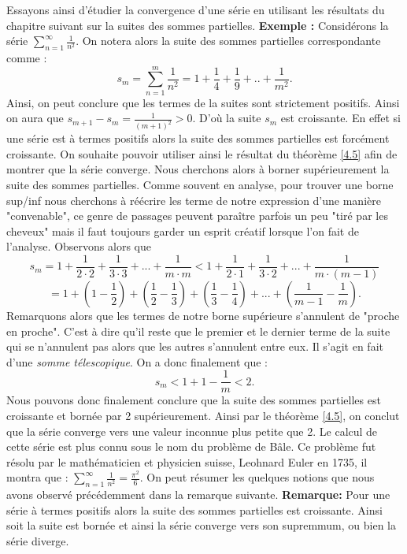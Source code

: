 \documentclass[a4paper, 12pt, french, twoside]{article}
\begin{document}
Essayons ainsi d'étudier la convergence d'une série en utilisant les résultats du chapitre suivant sur la suites des sommes partielles. \newline
\textbf{Exemple :} Considérons la série $\sum_{n=1}^{\infty} \frac{1}{n^2}$. On notera alors la suite des sommes partielles correspondante comme : $$ s_m = \sum_{n=1}^{m} \frac{1}{n^2} = 1 +  \frac{1}{4} + \frac{1}{9} + .. + \frac{1}{m^2}.$$
Ainsi, on peut conclure que les termes de la suites sont strictement positifs. Ainsi on aura que $s_{m+1} - s_m = \frac{1}{(m+1)^2} > 0$. D'où la suite $s_m$ est croissante. En effet si une série est à termes positifs alors la suite des sommes partielles est forcément croissante. On souhaite pouvoir utiliser ainsi le résultat du théorème \ref{4.5} afin de montrer que la série converge. Nous cherchons alors à borner supérieurement la suite des sommes partielles. Comme souvent en analyse, pour trouver une borne sup/inf nous cherchons à réécrire les terme de notre expression d'une manière "convenable", ce genre de passages peuvent paraître parfois un peu "tiré par les cheveux" mais il faut toujours garder un esprit créatif lorsque l'on fait de l'analyse. Observons alors que $$ s_m = 1 + \frac{1}{2\cdot2} + \frac{1}{3\cdot3} + ... + \frac{1}{m \cdot m} < 1 + \frac{1}{2\cdot1 } + \frac{1}{3\cdot2} + ... + \frac{1}{m \cdot (m-1)}$$
$$= 1 + \left ( 1 - \frac{1}{2} \right ) + \left ( \frac{1}{2} - \frac{1}{3} \right ) + \left ( \frac{1}{3} - \frac{1}{4} \right ) + ... + \left ( \frac{1}{m-1} - \frac{1}{m} \right ) .$$
Remarquons alors que les termes de notre borne supérieure s'annulent de "proche en proche". C'est à dire qu'il reste que le premier et le dernier terme de la suite qui se n'annulent pas alors que les autres s'annulent entre eux. Il s'agit en fait d'une \textit{somme télescopique}. On a donc finalement que : 
$$ s_m < 1+1-\frac{1}{m} < 2. $$ Nous pouvons donc finalement conclure que la suite des sommes partielles est croissante et bornée par 2 supérieurement. Ainsi par le théorème \ref{4.5}, on conclut que la série converge vers une valeur inconnue plus petite que 2. Le calcul de cette série est plus connu sous le nom du problème de Bâle. Ce problème fut résolu par le mathématicien et physicien suisse, Leohnard Euler en 1735, il montra que : $\sum_{n=1}^{\infty} \frac{1}{n^2} = \frac{\pi^2}{6}$. 
\newline 
On peut résumer les quelques notions que nous avons observé précédemment dans la remarque suivante. \newline 
\textbf{Remarque:}  
 Pour une série à termes positifs alors la suite des sommes partielles est croissante. Ainsi soit la suite est bornée et ainsi la série converge vers son supremmum, ou bien la série diverge. \newline 
\end{document}
